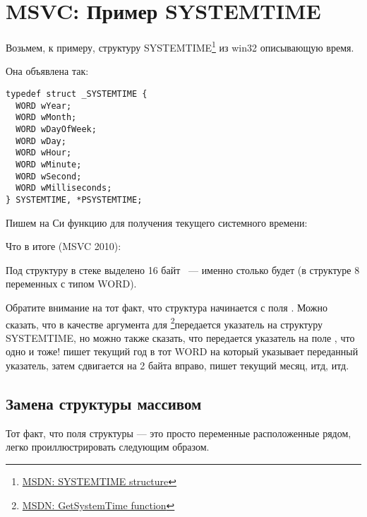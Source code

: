 \section{MSVC: Пример SYSTEMTIME}
\label{sec:SYSTEMTIME}

\newcommand{\FNSYSTEMTIME}{\footnote{\href{http://go.yurichev.com/17260}{MSDN: SYSTEMTIME structure}}}

Возьмем, к примеру, структуру SYSTEMTIME\FNSYSTEMTIME{} из win32 описывающую время.

Она объявлена так:

\begin{lstlisting}[caption=WinBase.h]
typedef struct _SYSTEMTIME {
  WORD wYear;
  WORD wMonth;
  WORD wDayOfWeek;
  WORD wDay;
  WORD wHour;
  WORD wMinute;
  WORD wSecond;
  WORD wMilliseconds;
} SYSTEMTIME, *PSYSTEMTIME;
\end{lstlisting}

Пишем на Си функцию для получения текущего системного времени:



Что в итоге (MSVC 2010):



Под структуру в стеке выделено 16 байт ~--- именно столько будет 
(в структуре 8 переменных с типом WORD).

\newcommand{\FNMSDNGST}{\footnote{\href{http://go.yurichev.com/17261}{MSDN: GetSystemTime function}}}

Обратите внимание на тот факт, что структура начинается с поля . 
Можно сказать, что в качестве аргумента для \FNMSDNGST передается указатель на структуру 
SYSTEMTIME, но можно также сказать, что передается указатель на поле , 
что одно и тоже! 
 пишет текущий год в тот WORD на который указывает переданный указатель, 
затем сдвигается на 2 байта вправо, пишет текущий месяц, итд, итд.



\subsection{Замена структуры массивом}

Тот факт, что поля структуры --- это просто переменные расположенные рядом, легко проиллюстрировать следующим образом.%

